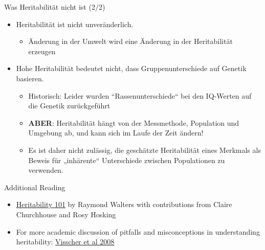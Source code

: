 \documentclass{beamer}
\begin{document}
\begin{frame}{Was Heritabilität nicht ist (2/2)}
\begin{itemize}
    \item Heritabilität ist nicht unveränderlich. 
    \begin{itemize}
        \item Änderung in der Umwelt wird eine Änderung in der Heritabilität erzeugen
    \end{itemize}
    \item Hohe Heritabilität bedeutet nicht, dass Gruppenunterschiede auf Genetik basieren.
    \begin{itemize}
        \item Historisch: Leider wurden “Rassenunterschiede“ bei den IQ-Werten auf die Genetik zurückgeführt
        \item \textbf{ABER}: Heritabilität hängt von der Messmethode, Population und Umgebung ab, und kann sich im Laufe der Zeit ändern!
        \item Es ist daher nicht zulässig, die geschätzte Heritabilität eines Merkmals als Beweis für „inhärente“ Unterschiede zwischen Populationen zu verwenden.
    \end{itemize}
\end{itemize}
\end{frame}

\begin{frame}{Additional Reading}
\begin{itemize}
    \item \href{http://www.nealelab.is/blog/2017/9/13/heritability-101-what-is-heritability}{Heritability 101} by Raymond Walters with contributions from Claire Churchhouse and Rosy Hosking
    \item For more academic discussion of pitfalls and misconceptions in understanding heritability: \href{https://www.nature.com/articles/nrg2322}{Visscher et al 2008 }
\end{itemize}
\end{frame}
\end{document}
